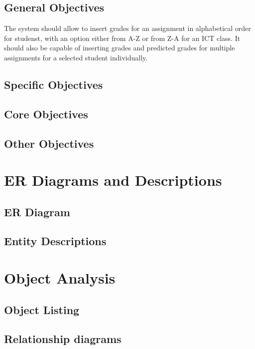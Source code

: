 \begin{algorithm}[H]
\subsection{General Objectives}

The system should allow to insert grades for an assignment in alphabetical order for studenst, with an option either from A-Z or from Z-A for an ICT class. It should also be capable of inserting grades and predicted grades for multiple assignments for a selected student individually.

\subsection{Specific Objectives}

\subsection{Core Objectives}

\subsection{Other Objectives}

\section{ER Diagrams and Descriptions}

\subsection{ER Diagram}

\subsection{Entity Descriptions}

\section{Object Analysis}

\subsection{Object Listing}

\subsection{Relationship diagrams}


\end{algorithm}
